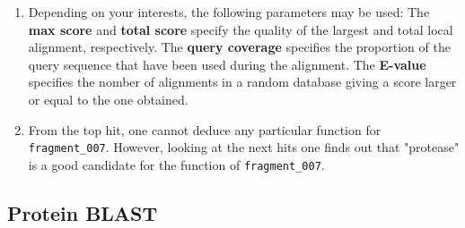 \documentclass[a4paper,11pt]{article}
\begin{document}
\begin{enumerate}
\item Depending on your interests, the following parameters may be used: The \textbf{max score} and \textbf{total score} specify the quality of the largest and total local alignment, respectively. The \textbf{query coverage} specifies the proportion of the query sequence that have been used during the alignment. The \textbf{E-value} specifies the nomber of alignments in a random database giving a score larger or equal to the one obtained. 

\item From the top hit, one cannot deduce any particular function for \texttt{fragment\_007}. However, looking at the next hits one finds out that "protease" is a good candidate for the function of \texttt{fragment\_007}.

\end{enumerate}

\subsection{Protein BLAST}
\end{document}
